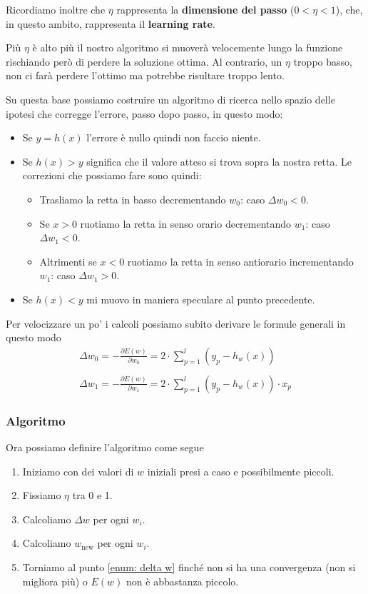 Ricordiamo inoltre che $\eta$ rappresenta la \textbf{dimensione del passo} ($0 < \eta < 1$), che, in questo ambito,
rappresenta il \textbf{learning rate}.

Pi\`u $\eta$ \`e alto pi\`u il nostro algoritmo si muover\`a velocemente lungo la funzione rischiando per\`o di perdere
la soluzione ottima. Al contrario, un $\eta$ troppo basso, non ci far\`a perdere l'ottimo ma potrebbe risultare troppo
lento.

Su questa base possiamo costruire un algoritmo di ricerca nello spazio delle ipotesi che corregge l'errore, passo dopo passo,
in questo modo:
\begin{itemize}
	\item Se $y = h(x)$ l'errore \`e nullo quindi non faccio niente.
	\item Se $h(x) > y$ significa che il valore atteso si trova sopra la nostra retta. Le correzioni che possiamo fare
	      sono quindi:
	      \begin{itemize}
		      \item Trasliamo la retta in basso decrementando $w_0$: caso $\Delta w_0 < 0$.
		      \item Se $x > 0$ ruotiamo la retta in senso orario decrementando $w_1$: caso $\Delta w_1 < 0$.
		      \item Altrimenti se $x < 0$ ruotiamo la retta in senso antiorario incrementando $w_1$: caso $\Delta w_1 > 0$.
	      \end{itemize}
	\item Se $h(x) < y$ mi muovo in maniera speculare al punto precedente.
\end{itemize}
Per velocizzare un po' i calcoli possiamo subito derivare le formule generali in questo modo
\begin{gather*}
	\Delta w_0 = -\frac{\partial E(w)}{\partial w_0} = 2 \cdot \sum_{p=1}^l (y_p - h_w(x)) \\
	\\
	\Delta w_1 = -\frac{\partial E(w)}{\partial w_1} = 2 \cdot \sum_{p=1}^l (y_p - h_w(x)) \cdot x_p
\end{gather*}

\subsubsection{Algoritmo}
Ora possiamo definire l'algoritmo come segue
\begin{enumerate}
	\item Iniziamo con dei valori di $w$ iniziali presi a caso e possibilmente piccoli.
	\item Fissiamo $\eta$ tra 0 e 1.
	\item \label{enum: delta w} Calcoliamo $\Delta w$ per ogni $w_i$.
	\item Calcoliamo $w_\text{new}$ per ogni $w_i$.
	\item Torniamo al punto \ref{enum: delta w} finch\'e non si ha una convergenza (non si migliora pi\`u) o
	      $E(w)$ non \`e abbastanza piccolo.
\end{enumerate}

